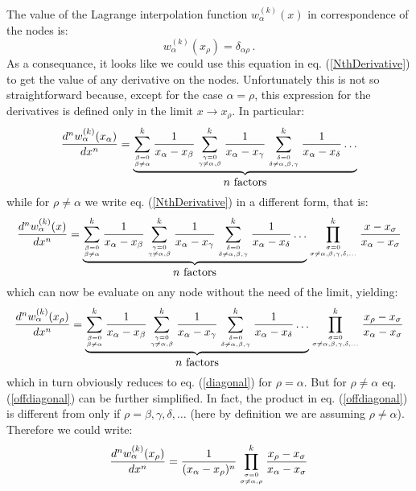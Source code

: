 \documentclass[10pt,a4paper]{article}
\begin{document}
The value of the Lagrange interpolation function $w_\alpha^{(k)}(x)$
in correspondence of the nodes is:
\begin{equation}
w_\alpha^{(k)}(x_\rho) = \delta_{\alpha\rho}\,.
\end{equation}
As a consequance, it looks like we could use this equation in
eq. (\ref{NthDerivative}) to get the value of any derivative on the
nodes. Unfortunately this is not so straightforward because, except
for the case $\alpha=\rho$, this expression for the derivatives is
defined only in the limit $x\rightarrow x_\rho$. In particular:
\begin{equation}\label{diagonal}
\frac{d^n w_\alpha^{(k)}(x_\alpha)}{dx^n}
=\underbrace{\sum_{\beta=0\atop \beta\neq\alpha}^k\frac{1}{x_\alpha-x_\beta}
\sum_{\gamma=0\atop \gamma\neq\alpha,\beta}^k\frac{1}{x_\alpha-x_\gamma}
\sum_{\delta=0\atop \delta\neq\alpha,\beta,\gamma}^k\frac{1}{x_\alpha-x_\delta}
\dots}_{\mbox{$n$ factors}}
\end{equation}
while for $\rho\neq\alpha$ we write eq. (\ref{NthDerivative}) in a
different form, that is:
\begin{equation}
\frac{d^n w_\alpha^{(k)}(x)}{dx^n}
=\underbrace{\sum_{\beta=0\atop \beta\neq\alpha}^k\frac{1}{x_\alpha-x_\beta}
\sum_{\gamma=0\atop \gamma\neq\alpha,\beta}^k\frac{1}{x_\alpha-x_\gamma}
\sum_{\delta=0\atop \delta\neq\alpha,\beta,\gamma}^k\frac{1}{x_\alpha-x_\delta}
\dots}_{\mbox{$n$ factors}}
\prod_{\sigma=0\atop\sigma\neq\alpha,\beta,\gamma,\delta,\dots}^k\frac{x - x_\sigma}{x_\alpha-x_\sigma} 
\end{equation}
which can now be evaluate on any node without the need of the limit, yielding:
\begin{equation}\label{offdiagonal}
\frac{d^n w_\alpha^{(k)}(x_\rho)}{dx^n}
=\underbrace{\sum_{\beta=0\atop \beta\neq\alpha}^k\frac{1}{x_\alpha-x_\beta}
\sum_{\gamma=0\atop \gamma\neq\alpha,\beta}^k\frac{1}{x_\alpha-x_\gamma}
\sum_{\delta=0\atop \delta\neq\alpha,\beta,\gamma}^k\frac{1}{x_\alpha-x_\delta}
\dots}_{\mbox{$n$ factors}}
\prod_{\sigma=0\atop\sigma\neq\alpha,\beta,\gamma,\delta,\dots}^k\frac{x_\rho - x_\sigma}{x_\alpha-x_\sigma} 
\end{equation}
which in turn obviously reduces to eq. (\ref{diagonal}) for
$\rho=\alpha$. But for $\rho\neq\alpha$ eq. (\ref{offdiagonal}) can be
further simplified. In fact, the product in eq. (\ref{offdiagonal}) is
different from only if
$\rho = \beta,\gamma,\delta,\dots$ (here by definition we are assuming $\rho \neq \alpha$). Therefore we could write:
\begin{equation}
\frac{d^n w_\alpha^{(k)}(x_\rho)}{dx^n}
=\frac{1}{(x_\alpha-x_\rho)^n}
\prod_{\sigma=0\atop\sigma\neq\alpha,\rho}^k\frac{x_\rho - x_\sigma}{x_\alpha-x_\sigma} 
\end{equation}
\end{document}
